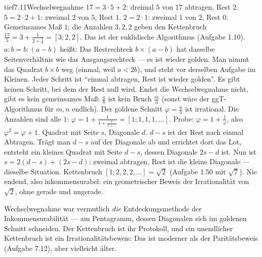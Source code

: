 \begin{loesungkarte}{tief}{7.11}{Wechselwegnahme}
$17 = 3\cdot5 + 2$: dreimal $5$ von $17$ abtragen, Rest $2$. $5 = 2\cdot2 + 1$: zweimal $2$ von $5$, Rest $1$. $2 = 2\cdot1$: zweimal $1$ von $2$, Rest $0$. Gemeinsames Maß $1$; die Anzahlen $3, 2, 2$ geben den Kettenbruch $\frac{17}5 = 3 + \frac1{2 + \frac12} = [3; 2, 2]$. Das ist der euklidische Algorithmus (Aufgabe 1.10).
$a : b = b : (a - b)$ heißt: Das Restrechteck $b\times(a - b)$ hat dasselbe Seitenverhältnis wie das Ausgangsrechteck --- es ist wieder golden. Man nimmt das Quadrat $b\times b$ weg (einmal, weil $a < 2b$), und steht vor derselben Aufgabe im Kleinen. Jeder Schritt ist \enquote{einmal abtragen, Rest ist wieder golden}. Es gibt keinen Schritt, bei dem der Rest null wird.
Endet die Wechselwegnahme nicht, gibt es kein gemeinsames Maß: $\frac ab$ ist kein Bruch $\frac mn$ (sonst wäre der ggT-Algorithmus für $m, n$ endlich). Der goldene Schnitt $\varphi = \frac ab$ ist irrational. Die Anzahlen sind alle $1$: $\varphi = 1 + \frac1{1 + \frac1{1 + \dots}} = [1; 1, 1, 1, \dots]$. Probe: $\varphi = 1 + \frac1\varphi$, also $\varphi^{2} = \varphi + 1$. \checkmark
{}
Quadrat mit Seite $s$, Diagonale $d$. $d - s$ ist der Rest nach einmal Abtragen. Trägt man $d - s$ auf der Diagonale ab und errichtet dort das Lot, entsteht ein kleines Quadrat mit Seite $d - s$, dessen Diagonale $2s - d$ ist. Nun ist $s = 2(d - s) + (2s - d)$: zweimal abtragen, Rest ist die kleine Diagonale --- dieselbe Situation. Kettenbruch $[1; 2, 2, 2, \dots] = \sqrt2$ (Aufgabe 1.50 mit $\sqrt7$). Nie endend, also inkommensurabel: ein geometrischer Beweis der Irrationalität von $\sqrt2$, ohne gerade und ungerade.
\begin{mitnehmen}\kastentext
Wechselwegnahme war vermutlich \emph{die} Entdeckungsmethode der Inkommensurabilität --- am Pentagramm, dessen Diagonalen sich im goldenen Schnitt schneiden. Der Kettenbruch ist ihr Protokoll, und ein unendlicher Kettenbruch ist ein Irrationalitätsbeweis: Das ist moderner als der Paritätsbeweis (Aufgabe 7.12), aber vielleicht älter.
\end{mitnehmen}
\end{loesungkarte}

